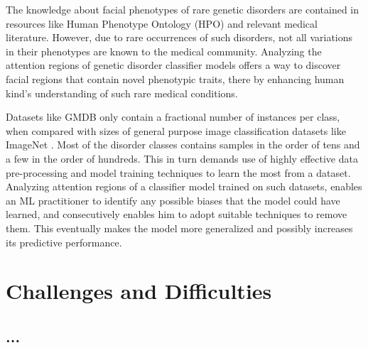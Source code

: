 \documentclass[../report.tex]{subfiles}
\begin{document}
    The knowledge about facial phenotypes of rare genetic disorders are contained in resources like Human Phenotype Ontology (HPO) \cite{hpo} and relevant medical literature. However, due to rare occurrences of such disorders, not all variations in their phenotypes are known to the medical community. Analyzing the attention regions of genetic disorder classifier models offers a way to discover facial regions that contain novel phenotypic traits, there by enhancing human kind's understanding of such rare medical conditions.
    
    Datasets like GMDB \cite{gmdb} only contain a fractional number of instances per class, when compared with sizes of general purpose image classification datasets like ImageNet \cite{deng2009imagenet}. Most of the disorder classes contains samples in the order of tens and a few in the order of hundreds. This in turn demands use of highly effective data pre-processing and model training techniques to learn the most from a dataset. Analyzing attention regions of a classifier model trained on such datasets, enables an ML practitioner to identify any possible biases that the model could have learned, and consecutively enables him to adopt suitable techniques to remove them. This eventually makes the model more generalized and possibly increases its predictive performance. 
    
    \section{Challenges and Difficulties}
    \subsection{...}

    \lipsum[11-15]
\end{document}
